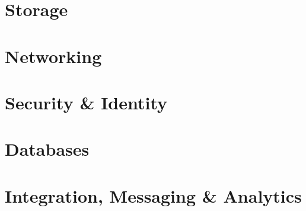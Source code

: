 \documentclass[12pt, a4paper]{article}
\begin{document}





\part{Storage}




\part{Networking}






\part{Security \& Identity}




\part{Databases}





\part{Integration, Messaging \& Analytics}
\end{document}
